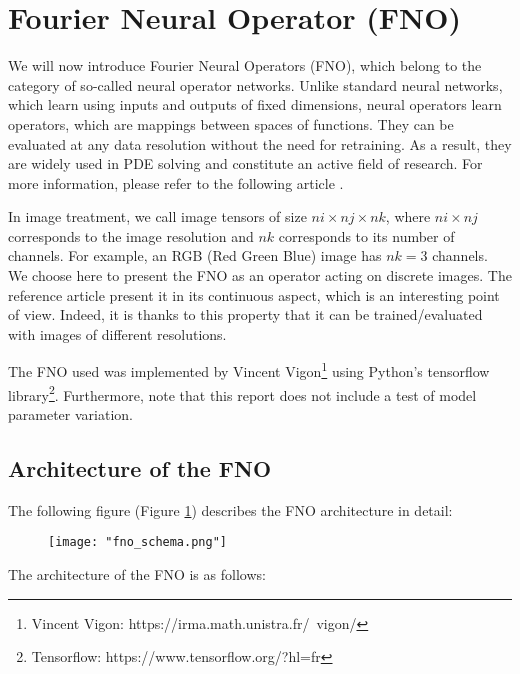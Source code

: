 \section{Fourier Neural Operator (FNO)} \label{FNO}
\graphicspath{{images/fourier}}

We will now introduce Fourier Neural Operators (FNO), which belong to the category of so-called neural operator networks. Unlike standard neural networks, which learn using inputs and outputs of fixed dimensions, neural operators learn operators, which are mappings between spaces of functions. They can be evaluated at any data resolution without the need for retraining. As a result, they are widely used in PDE solving and constitute an active field of research. For more information, please refer to the following article \cite{li_fourier_2021,li_fourier_2022,li_neural_2020,li_physics-informed_2023}.

In image treatment, we call image tensors of size $ni\times nj\times nk$, where $ni\times nj$ corresponds to the image resolution and $nk$ corresponds to its number of channels. For example, an RGB (Red Green Blue) image has $nk=3$ channels. 
We choose here to present the FNO as an operator acting on discrete images. The reference article \cite{li_fourier_2021} present it in its continuous aspect, which is an interesting point of view. Indeed, it is thanks to this property that it can be trained/evaluated with images of different resolutions.

\begin{Rem}
	The FNO used was implemented by Vincent Vigon\footnote{Vincent Vigon: https://irma.math.unistra.fr/~vigon/} using Python's tensorflow library\footnote{Tensorflow: https://www.tensorflow.org/?hl=fr}.
	Furthermore, note that this report does not include a test of model parameter variation.
\end{Rem}

\subsection{Architecture of the FNO}

The following figure (Figure \ref{FNO_schema}) describes the FNO architecture in detail:

\begin{figure}[H]
	\texttt{[image: "fno\_schema.png"]}
	\label{FNO_schema}
\end{figure}

The architecture of the FNO is as follows:

